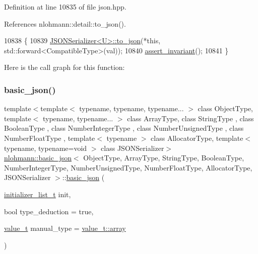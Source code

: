 Definition at line 10835 of file json.\+hpp.



References nlohmann\+::detail\+::to\+\_\+json().


\begin{DoxyCode}
10838     \{
10839         \hyperlink{namespacenlohmann_1_1detail_aa7a47b08eee864c2c108c04954919648}{JSONSerializer<U>::to\_json}(*\textcolor{keyword}{this}, std::forward<CompatibleType>(val));
10840         \hyperlink{classnlohmann_1_1basic__json_a4a82d3fb7a111641decf35c2fb707c7f}{assert\_invariant}();
10841     \}
\end{DoxyCode}
Here is the call graph for this function\+:
\mbox{\label{classnlohmann_1_1basic__json_ab5dfd9a2b2663b219641cb7fe59b6da2}} 
\subsubsection{\texorpdfstring{basic\+\_\+json()}{basic\_json()}\hspace{0.1cm}{\footnotesize\ttfamily [4/9]}}
{\footnotesize\ttfamily template$<$template$<$ typename, typename, typename... $>$ class Object\+Type, template$<$ typename, typename... $>$ class Array\+Type, class String\+Type , class Boolean\+Type , class Number\+Integer\+Type , class Number\+Unsigned\+Type , class Number\+Float\+Type , template$<$ typename $>$ class Allocator\+Type, template$<$ typename, typename=void $>$ class J\+S\+O\+N\+Serializer$>$ \\
\hyperlink{classnlohmann_1_1basic__json}{nlohmann\+::basic\+\_\+json}$<$ Object\+Type, Array\+Type, String\+Type, Boolean\+Type, Number\+Integer\+Type, Number\+Unsigned\+Type, Number\+Float\+Type, Allocator\+Type, J\+S\+O\+N\+Serializer $>$\+::\hyperlink{classnlohmann_1_1basic__json}{basic\+\_\+json} (\begin{DoxyParamCaption}\item[{\hyperlink{classnlohmann_1_1basic__json_ad70a098fbc01c53497db29d3b5b656a9}{initializer\+\_\+list\+\_\+t}}]{init,  }\item[{bool}]{type\+\_\+deduction = {\ttfamily true},  }\item[{\hyperlink{namespacenlohmann_1_1detail_a1ed8fc6239da25abcaf681d30ace4985}{value\+\_\+t}}]{manual\+\_\+type = {\ttfamily \hyperlink{namespacenlohmann_1_1detail_a1ed8fc6239da25abcaf681d30ace4985af1f713c9e000f5d3f280adbd124df4f5}{value\+\_\+t\+::array}} }\end{DoxyParamCaption})\hspace{0.3cm}{\ttfamily [inline]}}




